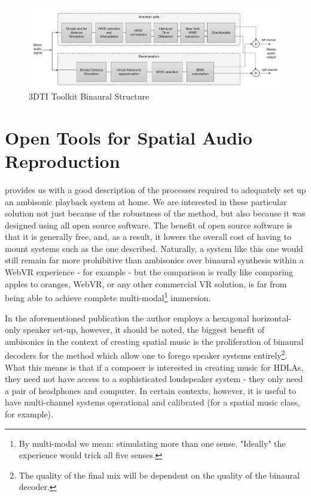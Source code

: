 \begin{figure}[ht!]%
\centering
\includegraphics[width=1.0\textwidth]{img/3dti-chain.png} 
\caption{3DTI Toolkit Binaural Structure \cite{cuevas20193d}}
\label{fig:3dti-chain}
\end{figure}


\section{Open Tools for Spatial Audio Reproduction}


\cite{nettingsmeier2008ambi} provides us with a good description of the processes required to adequately set up an ambisonic playback system at home. We are interested in these particular solution not just because of the robustness of the method, but also because it was designed using all open source software. The benefit of open source software is that it is generally free, and, as a result, it lowers the overall cost of having to mount systems such as the one described. Naturally, a system like this one would still remain far more prohibitive than ambisonics over binaural synthesis within a WebVR experience - for example - but the comparison is really like comparing apples to oranges, WebVR, or any other commercial VR solution, is far from being able to achieve complete multi-modal\footnote{By multi-modal we mean: stimulating more than one sense. "Ideally" the experience would trick all five senses.} immersion.

In the aforementioned publication the author employs a hexagonal horizontal-only speaker set-up, however, it should be noted, the biggest benefit of ambisonics in the context of creating spatial music is the proliferation of binaural decoders for the method which allow one to forego speaker systems entirely\footnote{The quality of the final mix will be dependent on the quality of the binaural decoder.}. What this means is that if a composer is interested in creating music for HDLAs, they need not have access to a sophisticated loudspeaker system - they only need a pair of headphones and computer. In certain contexts, however, it is useful to have multi-channel systems operational and calibrated (for a spatial music class, for example). 

